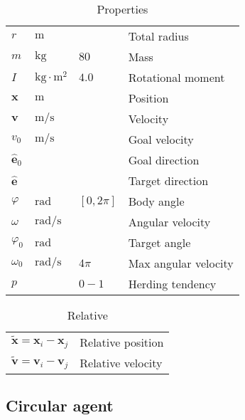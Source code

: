 \begin{table}[H]
\begin{tabularx}{1.0\linewidth}{ l l l l }
\hline
\hline
$ r $                    & $ \mathrm{m} $ &  & Total radius \\
$ m $                    & $ \mathrm{kg} $ & $ 80 $ & Mass \\
$ I $                    & $ \mathrm{kg \cdot m^{2}} $ & $ 4.0 $ & Rotational moment \\
\hline
\hline
$ \mathbf{x} $           & $ \mathrm{m} $ &  & Position \\
$ \mathbf{v} $           & $ \mathrm{m} / \mathrm{s} $ &  & Velocity \\
$ v_{0} $                & $ \mathrm{m} / \mathrm{s} $ &  & Goal velocity \\  
$ \hat{\mathbf{e}}_{0} $ &  &  & Goal direction \\
$ \hat{\mathbf{e}} $     &  &  & Target direction \\
\hline
\hline
$ \varphi $              & $ \mathrm{rad} $ & $ [0, 2 \pi] $ & Body angle \\
$ \omega $               & $ \mathrm{rad} / \mathrm{s} $ &  & Angular velocity \\
$ \varphi_{0} $          & $ \mathrm{rad} $ &  & Target angle \\
$ \omega_{0} $           & $ \mathrm{rad} / \mathrm{s} $ & $ 4\pi $ & Max angular velocity \\
\hline
\hline
$ p $                    &  & $ 0 - 1 $ & Herding tendency \\
\hline
\hline
\end{tabularx}
\caption{Properties}
\end{table}


\begin{table}[H]
\begin{tabularx}{1.0\linewidth}{ll}
\hline
\hline
$ \tilde{\mathbf{x}} = \mathbf{x}_{i} - \mathbf{x}_{j} $ & Relative position \\
$ \tilde{\mathbf{v}} = \mathbf{v}_{i} - \mathbf{v}_{j} $ & Relative velocity \\
\hline
\hline
\end{tabularx}
\caption{Relative}
\end{table}


\subsection{Circular agent}

